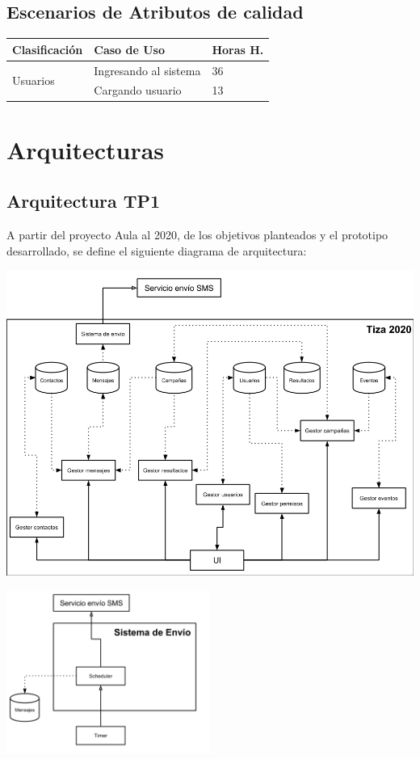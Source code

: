 \documentclass[a4paper, 11pt]{article}
\begin{document}
\subsection{Escenarios de Atributos de calidad}
\begin{table}[H]
\centering
\begin{tabular}{ | p{5cm} | p{8cm} | p{1.5cm} | }
\hline
Clasificación & Caso de Uso & Horas H.\\ \hline \hline
\multirow{2}{5cm}{Usuarios} & Ingresando al sistema & 36 \\ \cline{2-3}
& Cargando usuario & 13 \\ \hline
\end{tabular}
\end{table}


\newpage

\section{Arquitecturas}
\subsection{Arquitectura TP1}
A partir del proyecto Aula al 2020, de los objetivos planteados y el prototipo desarrollado, se define el siguiente diagrama de arquitectura:

\centerline{\includegraphics[width=1.2\textwidth]{./diagramas/ArquitecturaTP1.png}}
\centerline{\includegraphics[width=0.5\textwidth]{./diagramas/ArqTP1SistEnvio.png}}
\end{document}
